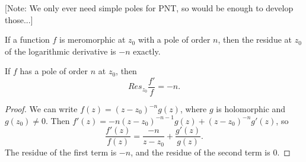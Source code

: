 [Note: We only ever need simple poles for PNT, so would be enough to develop those...]



If a function $f$ is meromorphic at $z_0$ with a pole of order $n$, then
the residue at $z_0$ of the logarithmic derivative is $-n$ exactly.
\begin{theorem}\label{ResidueOfLogDerivative}
If $f$ has a pole of order $n$ at $z_0$, then
$$
Res_{z_0} \frac{f'}f = -n.
$$
\end{theorem}



\begin{proof}
We can write $f(z) = (z-z_0)^{-n} g(z)$, where $g$ is holomorphic and $g(z_0) \neq 0$.
Then $f'(z) = -n(z-z_0)^{-n-1} g(z) + (z-z_0)^{-n} g'(z)$, so
$$
\frac{f'(z)}{f(z)} = \frac{-n}{z-z_0} + \frac{g'(z)}{g(z)}.
$$
The residue of the first term is $-n$, and the residue of the second term is $0$.
\end{proof}


